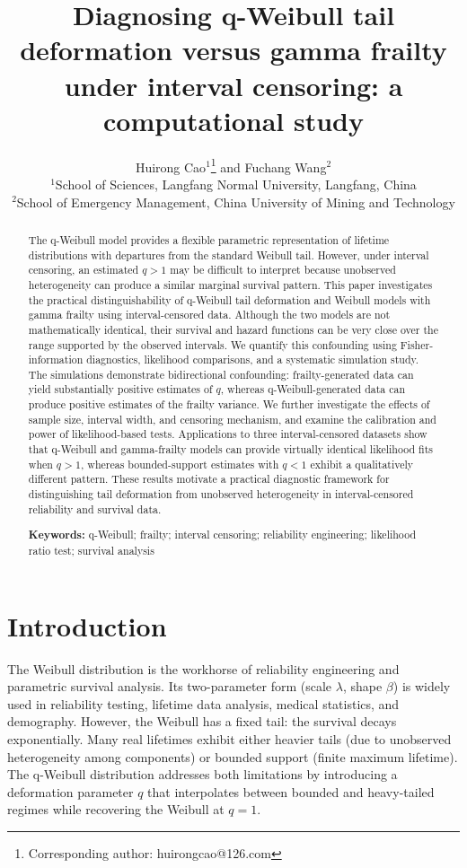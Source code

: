 \documentclass[12pt,a4paper]{article}
\title{Diagnosing q-Weibull tail deformation versus gamma frailty under interval censoring: a computational study}
\author{\small Huirong Cao$^{1}$\thanks{\small Corresponding author: huirongcao@126.com} and Fuchang Wang$^{2}$\\
\small $^{1}$School of Sciences, Langfang Normal University, Langfang, China\\
\small $^{2}$School of Emergency Management, China University of Mining and Technology}
\date{}
\begin{document}
\maketitle

\begin{abstract}
The q-Weibull model provides a flexible parametric representation of lifetime distributions with departures from the standard Weibull tail. However, under interval censoring, an estimated $q>1$ may be difficult to interpret because unobserved heterogeneity can produce a similar marginal survival pattern. This paper investigates the practical distinguishability of q-Weibull tail deformation and Weibull models with gamma frailty using interval-censored data. Although the two models are not mathematically identical, their survival and hazard functions can be very close over the range supported by the observed intervals. We quantify this confounding using Fisher-information diagnostics, likelihood comparisons, and a systematic simulation study. The simulations demonstrate bidirectional confounding: frailty-generated data can yield substantially positive estimates of $q$, whereas q-Weibull-generated data can produce positive estimates of the frailty variance. We further investigate the effects of sample size, interval width, and censoring mechanism, and examine the calibration and power of likelihood-based tests. Applications to three interval-censored datasets show that q-Weibull and gamma-frailty models can provide virtually identical likelihood fits when $q>1$, whereas bounded-support estimates with $q<1$ exhibit a qualitatively different pattern. These results motivate a practical diagnostic framework for distinguishing tail deformation from unobserved heterogeneity in interval-censored reliability and survival data.

\vspace{1em}\noindent\textbf{Keywords:} q-Weibull; frailty; interval censoring; reliability engineering; likelihood ratio test; survival analysis
\end{abstract}

\section{Introduction}

The Weibull distribution is the workhorse of reliability engineering and parametric survival analysis. Its two-parameter form (scale $\lambda$, shape $\beta$) is widely used in reliability testing, lifetime data analysis, medical statistics, and demography. However, the Weibull has a fixed tail: the survival decays exponentially. Many real lifetimes exhibit either heavier tails (due to unobserved heterogeneity among components) or bounded support (finite maximum lifetime). The q-Weibull distribution \citep{picoli2003q} addresses both limitations by introducing a deformation parameter $q$ that interpolates between bounded and heavy-tailed regimes while recovering the Weibull at $q=1$.
\end{document}
